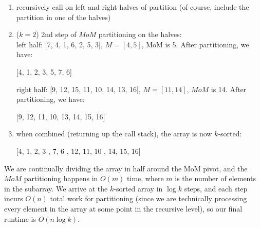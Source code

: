 \documentclass[12pt]{article}
\begin{document}
\begin{enumerate}
\begin{enumerate}
\begin{enumerate}
            \begin{center}
                [7, 4, 1, 6, 2, 5, 3, 9, 12, 15, 11, 10, 14, 13, 16]
            \end{center}

            \item recursively call on left and right halves of partition (of course, include the partition in one of the halves)
            \item ($k = 2$) 2nd step of $MoM$ partitioning on the halves:\\
            
            left half: [7, 4, 1, 6, 2, 5, 3], $M = [4, 5]$, MoM is 5. After partitioning, we have:\\

            \begin{center}
                [4, 1, 2, 3, 5, 7, 6]
            \end{center}
            
            right half: [9, 12, 15, 11, 10, 14, 13, 16], $M = [11, 14]$, $MoM$ is 14. After partitioning, we have:

            \begin{center}
                [9, 12, 11, 10, 13, 14, 15, 16]
            \end{center}

            \item when combined (returning up the call stack), the array is now $k$-sorted:
            
            \begin{center}
                [4, 1, 2, 3 , 7, 6 , 12, 11, 10 , 14, 15, 16]
            \end{center}

        \end{enumerate}

        We are continually dividing the array in half around the MoM pivot, and the $MoM$ partitioning happens in $O(m)$ 
        time, where $m$ is the number of elements in the subarray. We arrive at the $k$-sorted array in $\log k$ steps, 
        and each step incurs $O(n)$ total work for partitioning (since we are technically processing every element in the 
        array at some point in the recursive level), so our final runtime is $O(n\log k)$.


\end{enumerate}
\end{enumerate}
\end{document}

